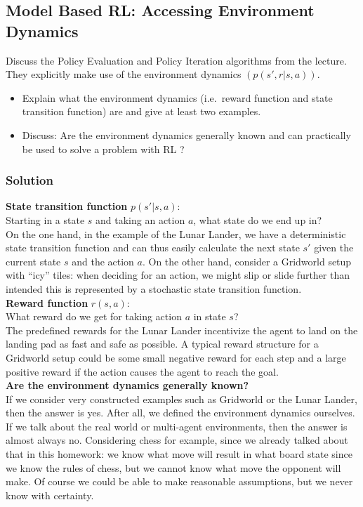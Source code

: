 \documentclass{article}
\begin{document}
\subsection{Model Based RL: Accessing Environment Dynamics}
Discuss the Policy Evaluation and Policy Iteration algorithms from the lecture.
They explicitly make use of the environment dynamics $(p(s', r | s, a))$.
\begin{itemize}
    \item Explain what the environment dynamics (i.e.\ reward function and
    state transition function) are and give at least two examples.
    \item Discuss: Are the environment dynamics generally known and can practically
    be used to solve a problem with RL \@?
\end{itemize}
\subsubsection{Solution}
\textbf{State transition function} $p(s' | s, a)$: \\
Starting in a state $s$ and taking an action $a$, what state do we end up in? \\
On the one hand, in the example of the Lunar Lander, we have a deterministic state transition function
and can thus easily calculate the next state $s'$ given the current state $s$ and the action $a$. 
On the other hand, consider a Gridworld setup with ``icy'' tiles: when deciding for an action, we might
slip or slide further than intended \textemdash{} this is represented by a stochastic state transition function. \\

\textbf{Reward function} $r(s, a)$: \\
What reward do we get for taking action $a$ in state $s$? \\
The predefined rewards for the Lunar Lander incentivize the agent to land on the landing pad as fast 
and safe as possible. A typical reward structure for a Gridworld setup could be some small negative reward
for each step and a large positive reward if the action causes the agent to reach the goal. \\

\textbf{Are the environment dynamics generally known?} \\
If we consider very constructed examples such as Gridworld or the Lunar Lander, then the answer is yes.
After all, we defined the environment dynamics ourselves. If we talk about the real world or
multi-agent environments, then the answer is almost always no. 
Considering chess for example, since we already talked about
that in this homework: we know what move will result in what board state since we know the
rules of chess, but we cannot know what move the opponent will make. Of course we could be able to make 
reasonable assumptions, but we never know with certainty. \\
\end{document}
